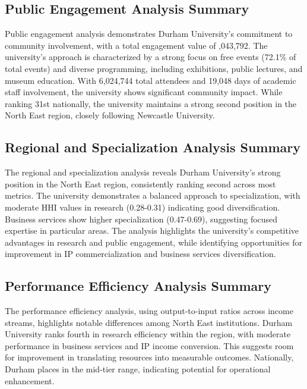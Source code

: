 \documentclass[journal,onecolumn, 10pt,draftclsnofoot]{IEEEtran}
\begin{document}
\subsection{Public Engagement Analysis Summary}

Public engagement analysis demonstrates Durham University's commitment to community involvement, with a total engagement value of ,043,792. The university's approach is characterized by a strong focus on free events (72.1\% of total events) and diverse programming, including exhibitions, public lectures, and museum education. With 6,024,744 total attendees and 19,048 days of academic staff involvement, the university shows significant community impact. While ranking 31st nationally, the university maintains a strong second position in the North East region, closely following Newcastle University.

\subsection{Regional and Specialization Analysis Summary}

The regional and specialization analysis reveals Durham University's strong position in the North East region, consistently ranking second across most metrics. The university demonstrates a balanced approach to specialization, with moderate HHI values in research (0.28-0.31) indicating good diversification. Business services show higher specialization (0.47-0.69), suggesting focused expertise in particular areas. The analysis highlights the university's competitive advantages in research and public engagement, while identifying opportunities for improvement in IP commercialization and business services diversification.

\subsection{Performance Efficiency Analysis Summary}

The performance efficiency analysis, using output-to-input ratios across income streams, highlights notable differences among North East institutions. Durham University ranks fourth in research efficiency within the region, with moderate performance in business services and IP income conversion. This suggests room for improvement in translating resources into measurable outcomes. Nationally, Durham places in the mid-tier range, indicating potential for operational enhancement.
\end{document}
